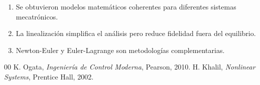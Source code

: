 \documentclass[conference]{IEEEtran}
\begin{document}
\begin{enumerate}
\item Se obtuvieron modelos matemáticos coherentes para diferentes sistemas mecatrónicos.
\item La linealización simplifica el análisis pero reduce fidelidad fuera del equilibrio.
\item Newton-Euler y Euler-Lagrange son metodologías complementarias.
\end{enumerate}

\begin{thebibliography}{00}
 K. Ogata, \emph{Ingeniería de Control Moderna}, Pearson, 2010.
 H. Khalil, \emph{Nonlinear Systems}, Prentice Hall, 2002.
\end{thebibliography}
\end{document}
